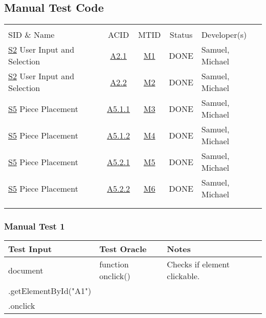 \documentclass[11pt]{article}
\begin{document}
\subsection{Manual Test Code}
\label{sec:orgde2815f}
\begin{center}
\begin{tabular}{|p{4.5cm}|c|c|c|p{3.0cm}|}
 &  &  &  & \\
SID \& Name & ACID & MTID & Status & Developer(s)\\
\hline
\hyperref[sec:orgc754eda]{S2} User Input and Selection & \hyperref[sec:org1818dbf]{A2.1} & \hyperref[sec:org196baca]{M1} & DONE & Samuel, Michael\\
\hyperref[sec:orgc754eda]{S2} User Input and Selection & \hyperref[sec:org1818dbf]{A2.2} & \hyperref[sec:org9ce9e4b]{M2} & DONE & Samuel, Michael\\
\hyperref[sec:orga52ce5b]{S5} Piece Placement & \hyperref[sec:org7ed082b]{A5.1.1} & \hyperref[sec:org3e669e4]{M3} & DONE & Samuel, Michael\\
\hyperref[sec:orga52ce5b]{S5} Piece Placement & \hyperref[sec:org7ed082b]{A5.1.2} & \hyperref[sec:org76a3987]{M4} & DONE & Samuel, Michael\\
\hyperref[sec:orga52ce5b]{S5} Piece Placement & \hyperref[sec:org7ed082b]{A5.2.1} & \hyperref[sec:orgd65a4d0]{M5} & DONE & Samuel, Michael\\
\hyperref[sec:orga52ce5b]{S5} Piece Placement & \hyperref[sec:org7ed082b]{A5.2.2} & \hyperref[sec:org6b4f489]{M6} & DONE & Samuel, Michael\\
 &  &  &  & \\
 &  &  &  & \\
\end{tabular}
\end{center}
\subsubsection{Manual Test 1}
\label{sec:org196baca}
\begin{center}
\begin{tabular}{|p{6.0cm}|p{4.0cm}|p{3.0cm}|}
Test Input & Test Oracle & Notes\\
\hline
document & function onclick() & Checks if element clickable.\\
.getElementById("A1") &  & \\
.onclick &  & \\
\end{tabular}
\end{center}
\end{document}
